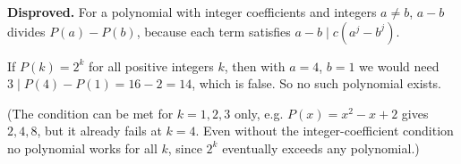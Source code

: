 \textbf{Disproved.} For a polynomial with integer coefficients and integers \(a\ne b\), \(a-b\) divides \(P(a)-P(b)\), because each term satisfies \(a-b\mid c(a^j-b^j)\).

If \(P(k)=2^k\) for all positive integers \(k\), then with \(a=4\), \(b=1\) we would need \(3\mid P(4)-P(1)=16-2=14\), which is false. So no such polynomial exists.

(The condition can be met for \(k=1,2,3\) only, e.g. \(P(x)=x^2-x+2\) gives \(2,4,8\), but it already fails at \(k=4\). Even without the integer-coefficient condition no polynomial works for all \(k\), since \(2^k\) eventually exceeds any polynomial.)
